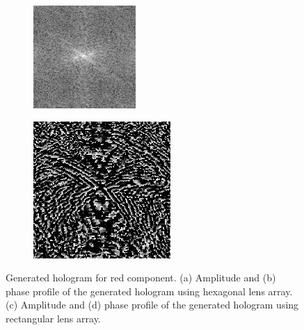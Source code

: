 \documentclass[10pt,letterpaper]{article}
\begin{document}
\begin{figure}[htb]
\begin{subfigure}[b]{0.2\linewidth}
	\centering
	\caption{}
	\end{subfigure}

	\captionsetup[subfigure]{justification=centering}
	\begin{subfigure}[b]{0.2\linewidth}
	\centering
	\includegraphics[width=1\columnwidth]{fig10_c}
	\caption{}
	\end{subfigure}
	\begin{subfigure}[b]{0.2\linewidth}
	\includegraphics[width=1\columnwidth]{fig10_d}
	\centering
	\caption{}
	\end{subfigure}
\caption{Generated hologram for red component. (a) Amplitude and (b) phase profile of the generated hologram using hexagonal lens array. (c) Amplitude and (d) phase profile of the generated hologram using rectangular lens array.}
\label{fig_10}
\end{figure}
\end{document}
